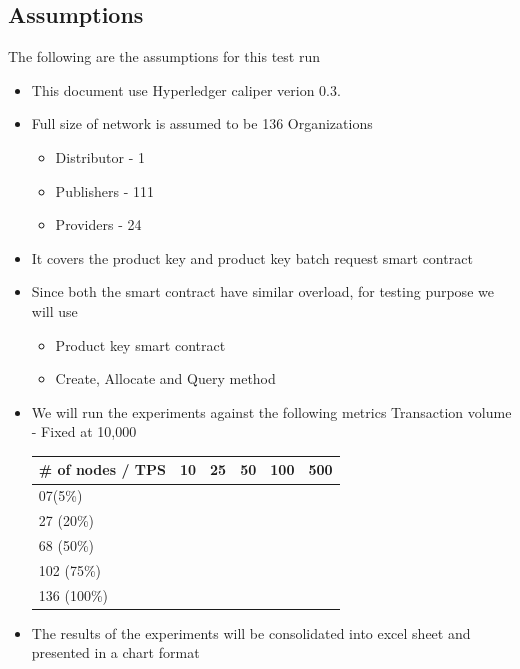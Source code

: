 \documentclass{ceadar_article}
\begin{document}
\subsection{Assumptions}
The following are the assumptions for this test run
\begin{itemize}
    \item This document use Hyperledger caliper verion 0.3.
    \item Full size of network is assumed to be 136 Organizations
    \begin{itemize}
        \item Distributor - 1
        \item Publishers - 111
        \item Providers - 24
    \end{itemize}
    \item It covers the product key and product key batch request smart contract
    \item Since both the smart contract have similar overload, for testing purpose we will use 
    \begin{itemize}
        \item Product key smart contract
        \item Create, Allocate and Query method
    \end{itemize}
    \item We will run the experiments against the following metrics
    \newline Transaction volume - Fixed at 10,000

       \begin{tabular}{|l|l|l|l|l|l|}
\hline
\# of nodes / TPS                   & 10  & 25  & 50   & 100 & 500 \\ \hline
07(5\%)                             &     &     &      &     &      \\ \hline
27 (20\%)                           &     &     &      &     &      \\ \hline
68 (50\%)                           &     &     &      &     &      \\ \hline
102 (75\%)                          &     &     &      &     &      \\ \hline
136 (100\%)                         &     &     &      &     &      \\ \hline
\end{tabular}
    \item The results of the experiments will be consolidated into excel sheet and presented in a chart format
\end{itemize}
\end{document}
